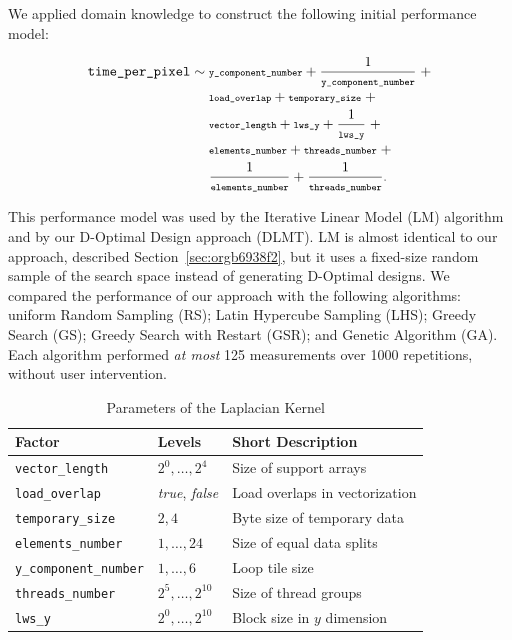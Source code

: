 \documentclass[conference]{IEEEtran}
\begin{document}
We applied domain knowledge to construct the following initial performance model:
\vspace{-2pt}
\\\begin{minipage}{\linewidth}\scriptsize
\begin{align}
\label{eq:gpu_laplacian_performance_model}
\texttt{time\_per\_pixel} \sim & \scriptsize\; \texttt{y\_component\_number} + \frac{1}{\texttt{y\_component\_number}} \; + \nonumber \\
& \scriptsize\; \texttt{load\_overlap} + \texttt{temporary\_size} \; + \nonumber \\
& \scriptsize\; \texttt{vector\_length} + \texttt{lws\_y} + \frac{1}{\texttt{lws\_y}} \; + \\
& \scriptsize\; \texttt{elements\_number} + \texttt{threads\_number}  \; + \nonumber \\
& \scriptsize\; \frac{1}{\texttt{elements\_number}} + \frac{1}{\texttt{threads\_number}}\text{.} \nonumber
\end{align}
\vspace{2pt}
\end{minipage}
This performance model was used by the Iterative Linear Model (LM) algorithm and
by our D-Optimal Design approach (DLMT). LM is almost identical to our approach,
described  Section~\ref{sec:orgb6938f2},  but  it  uses  a
fixed-size random  sample of  the search space  instead of  generating D-Optimal
designs.  We  compared  the  performance  of our  approach  with  the  following
algorithms: uniform Random Sampling (RS); Latin Hypercube Sampling (LHS); Greedy
Search (GS); Greedy Search with Restart  (GSR); and Genetic Algorithm (GA). Each
algorithm performed \emph{at most} 125 measurements over 1000 repetitions, without user
intervention.

\begin{table}[t]
\caption{\label{tab:org5c5e9b6}
Parameters of the Laplacian Kernel}
\centering
\scriptsize
\begin{tabular}{llp{}}
\toprule
Factor & Levels & Short Description\\
\midrule
\texttt{vector\_length} & \(2^0,\dots,2^4\) & Size of support arrays\\
\texttt{load\_overlap} & \textit{true}, \textit{false} & Load overlaps in vectorization\\
\texttt{temporary\_size} & \(2,4\) & Byte size of temporary data\\
\texttt{elements\_number} & \(1,\dots,24\) & Size of equal data splits\\
\texttt{y\_component\_number} & \(1,\dots,6\) & Loop tile size\\
\texttt{threads\_number} & \(2^5,\dots,2^{10}\) & Size of thread groups\\
\texttt{lws\_y} & \(2^0,\dots,2^{10}\) & Block size in \(y\) dimension\\
\bottomrule
\end{tabular}
\end{table}
\end{document}
